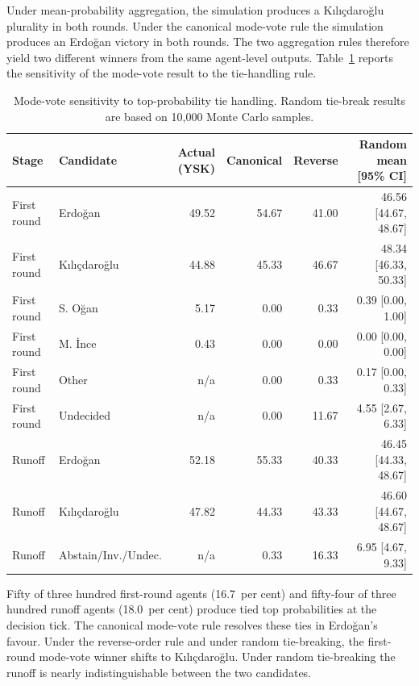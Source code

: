 \documentclass[12pt,a4paper]{report}
\begin{document}
Under mean-probability aggregation, the simulation produces a Kılıçdaroğlu plurality in both rounds. Under the canonical mode-vote rule the simulation produces an Erdoğan victory in both rounds. The two aggregation rules therefore yield two different winners from the same agent-level outputs. Table~\ref{tab:tie_sensitivity} reports the sensitivity of the mode-vote result to the tie-handling rule.

\begin{table}[!ht]
\caption{Mode-vote sensitivity to top-probability tie handling. Random tie-break results are based on 10{,}000 Monte Carlo samples.}
\label{tab:tie_sensitivity}
\centering
\footnotesize
\begin{tabular}{@{}llrrrr@{}}
\toprule
Stage & Candidate & Actual (YSK) & Canonical & Reverse & Random mean [95\% CI] \\
\midrule
First round & Erdoğan      & 49.52 & 54.67 & 41.00 & 46.56 [44.67, 48.67] \\
First round & Kılıçdaroğlu & 44.88 & 45.33 & 46.67 & 48.34 [46.33, 50.33] \\
First round & S. Oğan      &  5.17 &  0.00 &  0.33 &  0.39 [0.00, 1.00] \\
First round & M. İnce      &  0.43 &  0.00 &  0.00 &  0.00 [0.00, 0.00] \\
First round & Other        &  n/a &  0.00 &  0.33 &  0.17 [0.00, 0.33] \\
First round & Undecided    &  n/a &  0.00 & 11.67 &  4.55 [2.67, 6.33] \\
\midrule
Runoff      & Erdoğan      & 52.18 & 55.33 & 40.33 & 46.45 [44.33, 48.67] \\
Runoff      & Kılıçdaroğlu & 47.82 & 44.33 & 43.33 & 46.60 [44.67, 48.67] \\
Runoff      & Abstain/Inv./Undec. & n/a & 0.33 & 16.33 &  6.95 [4.67, 9.33] \\
\bottomrule
\end{tabular}
\end{table}

Fifty of three hundred first-round agents (16.7~per cent) and fifty-four of three hundred runoff agents (18.0~per cent) produce tied top probabilities at the decision tick. The canonical mode-vote rule resolves these ties in Erdoğan's favour. Under the reverse-order rule and under random tie-breaking, the first-round mode-vote winner shifts to Kılıçdaroğlu. Under random tie-breaking the runoff is nearly indistinguishable between the two candidates.
\end{document}
